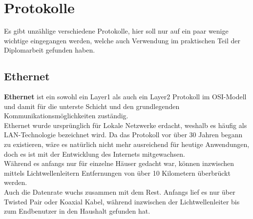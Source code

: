 \documentclass[12pt,a4paper]{report}
\begin{document}
\section{Protokolle}
Es gibt unzählige verschiedene Protokolle, hier soll nur auf ein paar wenige wichtige eingegangen werden, welche auch Verwendung im praktischen Teil der Diplomarbeit gefunden haben.
\subsection{Ethernet}\label{ssec:eth}
\textbf{Ethernet} ist ein sowohl ein Layer1 als auch ein Layer2 Protokoll im OSI-Modell und damit für die unterste Schicht und den grundlegenden Kommunikationsmöglichkeiten zuständig.\\

Ethernet wurde ursprünglich für Lokale Netzwerke erdacht, weshalb es häufig als LAN-Technologie bezeichnet wird. Da das Protokoll vor über 30 Jahren begann zu existieren, wäre es natürlich nicht mehr ausreichend für heutige Anwendungen, doch es ist mit der Entwicklung des Internets mitgewachsen.\\
Während es anfangs nur für einzelne Häuser gedacht war, können inzwischen mittels Lichtwellenleitern Entfernungen von über 10 Kilometern überbrückt werden.\\

Auch die Datenrate wuchs zusammen mit dem Rest. Anfangs lief es nur über Twisted Pair oder Koaxial Kabel, während inzwischen der Lichtwellenleiter bis zum Endbenutzer in den Haushalt gefunden hat.\\
\end{document}
